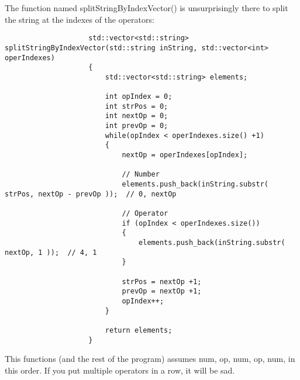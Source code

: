 \documentclass{article}
\begin{document}
				The function named splitStringByIndexVector() is unsurprisingly there to split the string at the indexes of the operators:
				\begin{lstlisting}
					std::vector<std::string> splitStringByIndexVector(std::string inString, std::vector<int> operIndexes)
					{
						std::vector<std::string> elements;
						
						int opIndex = 0;
						int strPos = 0;
						int nextOp = 0;
						int prevOp = 0;
						while(opIndex < operIndexes.size() +1)
						{
							nextOp = operIndexes[opIndex];
							
							// Number
							elements.push_back(inString.substr( strPos, nextOp - prevOp ));  // 0, nextOp
							
							// Operator
							if (opIndex < operIndexes.size())
							{
								elements.push_back(inString.substr( nextOp, 1 ));  // 4, 1
							}
							
							strPos = nextOp +1;
							prevOp = nextOp +1;
							opIndex++;
						}
						
						return elements;
					}
				\end{lstlisting}
				
				This functions (and the rest of the program) assumes num, op, num, op, num, in this order. If you put multiple operators in a row, it will be sad.
			
			
\end{document}
